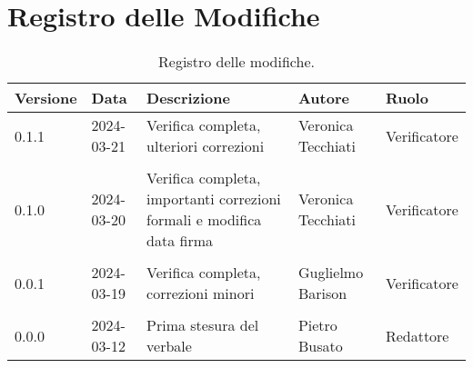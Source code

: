 \section*{Registro delle Modifiche}
\begin{table}[ht!]	
		\centering
		\begin{tabular}{p{1.2cm} p{2cm} p{6cm} p{3cm} p{2cm}}
			\toprule
			\textbf{Versione}& \textbf{Data} & \textbf{Descrizione} & \textbf{Autore} & \textbf{Ruolo} \\
			\midrule
                0.1.1 & 2024-03-21 & Verifica completa, ulteriori correzioni & Veronica Tecchiati & Verificatore \\\\
			0.1.0 & 2024-03-20 & Verifica completa, importanti correzioni formali e modifica data firma & Veronica Tecchiati & Verificatore \\\\
			0.0.1 & 2024-03-19 & Verifica completa, correzioni minori & Guglielmo Barison & Verificatore \\\\
			0.0.0 & 2024-03-12 & Prima stesura del verbale & Pietro Busato & Redattore \\
			\bottomrule
		\end{tabular}
		\caption{Registro delle modifiche.}
		\label{table:Registro delle modifiche}
\end{table}